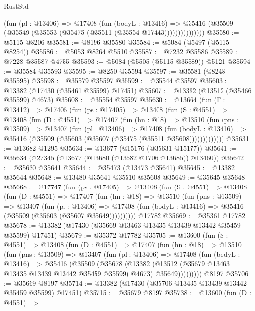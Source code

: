 \begin{lexlean}{RustStd}
\begin{coremodule}
                  (fun (pl : @13406) =>
                  @17408
                    (fun (bodyL : @13416) =>
                    @35416 (@35509 (@35549 (@35553 (@35475 (@35511 (@35554 @17443)))))))))))))))
@35580 := @5115 @8206
@35581 := @8196 @35580
@35584 := @5084 (@5497 (@5115 @8254))
@35586 := @5053 @8264 @5510
@35587 := @7232 @35586
@35589 := @7228 @35587 @4755
@35593 := @5084 (@5505 (@5115 @35589)) @5121
@35594 := @35584 @35593
@35595 := @8250 @35594
@35597 := @35581 (@8248 @35595)
@35598 := @35579 @35597
@35599 := @35544 @35597
@35603 := @13382 (@17430 (@35461 @35599) @17451)
@35607 := @13382 (@13512 (@35466 @35599) @4673)
@35608 := @35554 @35597
@35630 := @13664
    (fun (Γ : @13412) =>
    @17406
      (fun (ps : @17405) =>
      @13408
        (fun (S : @4551) =>
        @13408
          (fun (D : @4551) =>
          @17407
            (fun (hn : @18) =>
            @13510
              (fun (pns : @13509) =>
              @13407
                (fun (pl : @13406) =>
                @17408
                  (fun (bodyL : @13416) =>
                  @35416 (@35509 (@35603 (@35607 (@35475 (@35511 @35608)))))))))))))
@35631 := @13682 @1295
@35634 := @13677 (@15176 (@35631 @15177))
@35641 := @35634 (@27345 (@13677 (@13680 (@13682 @1706 @13685)) @13460))
@35642 := @35630 @35641
@35644 := @35473 (@13473 @35641)
@35645 := @13382 @35644
@35648 := @13480 @35641 @35510 @35608
@35649 := @35645 @35648
@35668 := @17747
    (fun (ps : @17405) =>
    @13408
      (fun (S : @4551) =>
      @13408
        (fun (D : @4551) =>
        @17407
          (fun (hn : @18) =>
          @13510
            (fun (pns : @13509) =>
            @13407
              (fun (pl : @13406) =>
              @17408 (fun (bodyL : @13416) => @35416 (@35509 (@35603 (@35607 @35649))))))))))
    @17782
@35669 := @35361 @17782
@35678 := @13382 (@17430 (@35669 @13463 @13435 @13439 @13442 @35459 @35599) @17451)
@35679 := @35372 @17782
@35705 := @13600
    (fun (S : @4551) =>
    @13408
      (fun (D : @4551) =>
      @17407
        (fun (hn : @18) =>
        @13510
          (fun (pns : @13509) =>
          @13407
            (fun (pl : @13406) =>
            @17408
              (fun (bodyL : @13416) =>
              @35416
                (@35509
                  (@35678
                    (@13382
                      (@13512 (@35679 @13463 @13435 @13439 @13442 @35459 @35599) @4673)
                      @35649)))))))))
    @8197
@35706 := @35669 @8197
@35714 := @13382 (@17430 (@35706 @13435 @13439 @13442 @35459 @35599) @17451)
@35715 := @35679 @8197
@35738 := @13600
    (fun (D : @4551) =>

\end{coremodule}
\end{lexlean}
